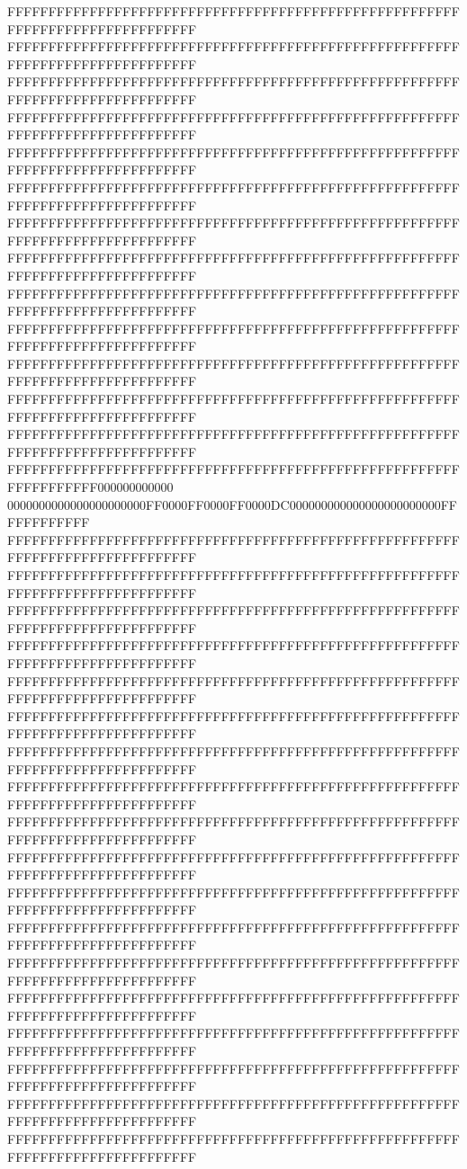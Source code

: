 FFFFFFFFFFFFFFFFFFFFFFFFFFFFFFFFFFFFFFFFFFFFFFFFFFFFFFFFFFFFFFFFFFFFFFFFFFFFFF
FFFFFFFFFFFFFFFFFFFFFFFFFFFFFFFFFFFFFFFFFFFFFFFFFFFFFFFFFFFFFFFFFFFFFFFFFFFFFF
FFFFFFFFFFFFFFFFFFFFFFFFFFFFFFFFFFFFFFFFFFFFFFFFFFFFFFFFFFFFFFFFFFFFFFFFFFFFFF
FFFFFFFFFFFFFFFFFFFFFFFFFFFFFFFFFFFFFFFFFFFFFFFFFFFFFFFFFFFFFFFFFFFFFFFFFFFFFF
FFFFFFFFFFFFFFFFFFFFFFFFFFFFFFFFFFFFFFFFFFFFFFFFFFFFFFFFFFFFFFFFFFFFFFFFFFFFFF
FFFFFFFFFFFFFFFFFFFFFFFFFFFFFFFFFFFFFFFFFFFFFFFFFFFFFFFFFFFFFFFFFFFFFFFFFFFFFF
FFFFFFFFFFFFFFFFFFFFFFFFFFFFFFFFFFFFFFFFFFFFFFFFFFFFFFFFFFFFFFFFFFFFFFFFFFFFFF
FFFFFFFFFFFFFFFFFFFFFFFFFFFFFFFFFFFFFFFFFFFFFFFFFFFFFFFFFFFFFFFFFFFFFFFFFFFFFF
FFFFFFFFFFFFFFFFFFFFFFFFFFFFFFFFFFFFFFFFFFFFFFFFFFFFFFFFFFFFFFFFFFFFFFFFFFFFFF
FFFFFFFFFFFFFFFFFFFFFFFFFFFFFFFFFFFFFFFFFFFFFFFFFFFFFFFFFFFFFFFFFFFFFFFFFFFFFF
FFFFFFFFFFFFFFFFFFFFFFFFFFFFFFFFFFFFFFFFFFFFFFFFFFFFFFFFFFFFFFFFFFFFFFFFFFFFFF
FFFFFFFFFFFFFFFFFFFFFFFFFFFFFFFFFFFFFFFFFFFFFFFFFFFFFFFFFFFFFFFFFFFFFFFFFFFFFF
FFFFFFFFFFFFFFFFFFFFFFFFFFFFFFFFFFFFFFFFFFFFFFFFFFFFFFFFFFFFFFFFFFFFFFFFFFFFFF
FFFFFFFFFFFFFFFFFFFFFFFFFFFFFFFFFFFFFFFFFFFFFFFFFFFFFFFFFFFFFFFFFF000000000000
0000000000000000000000FF0000FF0000FF0000DC000000000000000000000000FFFFFFFFFFFF
FFFFFFFFFFFFFFFFFFFFFFFFFFFFFFFFFFFFFFFFFFFFFFFFFFFFFFFFFFFFFFFFFFFFFFFFFFFFFF
FFFFFFFFFFFFFFFFFFFFFFFFFFFFFFFFFFFFFFFFFFFFFFFFFFFFFFFFFFFFFFFFFFFFFFFFFFFFFF
FFFFFFFFFFFFFFFFFFFFFFFFFFFFFFFFFFFFFFFFFFFFFFFFFFFFFFFFFFFFFFFFFFFFFFFFFFFFFF
FFFFFFFFFFFFFFFFFFFFFFFFFFFFFFFFFFFFFFFFFFFFFFFFFFFFFFFFFFFFFFFFFFFFFFFFFFFFFF
FFFFFFFFFFFFFFFFFFFFFFFFFFFFFFFFFFFFFFFFFFFFFFFFFFFFFFFFFFFFFFFFFFFFFFFFFFFFFF
FFFFFFFFFFFFFFFFFFFFFFFFFFFFFFFFFFFFFFFFFFFFFFFFFFFFFFFFFFFFFFFFFFFFFFFFFFFFFF
FFFFFFFFFFFFFFFFFFFFFFFFFFFFFFFFFFFFFFFFFFFFFFFFFFFFFFFFFFFFFFFFFFFFFFFFFFFFFF
FFFFFFFFFFFFFFFFFFFFFFFFFFFFFFFFFFFFFFFFFFFFFFFFFFFFFFFFFFFFFFFFFFFFFFFFFFFFFF
FFFFFFFFFFFFFFFFFFFFFFFFFFFFFFFFFFFFFFFFFFFFFFFFFFFFFFFFFFFFFFFFFFFFFFFFFFFFFF
FFFFFFFFFFFFFFFFFFFFFFFFFFFFFFFFFFFFFFFFFFFFFFFFFFFFFFFFFFFFFFFFFFFFFFFFFFFFFF
FFFFFFFFFFFFFFFFFFFFFFFFFFFFFFFFFFFFFFFFFFFFFFFFFFFFFFFFFFFFFFFFFFFFFFFFFFFFFF
FFFFFFFFFFFFFFFFFFFFFFFFFFFFFFFFFFFFFFFFFFFFFFFFFFFFFFFFFFFFFFFFFFFFFFFFFFFFFF
FFFFFFFFFFFFFFFFFFFFFFFFFFFFFFFFFFFFFFFFFFFFFFFFFFFFFFFFFFFFFFFFFFFFFFFFFFFFFF
FFFFFFFFFFFFFFFFFFFFFFFFFFFFFFFFFFFFFFFFFFFFFFFFFFFFFFFFFFFFFFFFFFFFFFFFFFFFFF
FFFFFFFFFFFFFFFFFFFFFFFFFFFFFFFFFFFFFFFFFFFFFFFFFFFFFFFFFFFFFFFFFFFFFFFFFFFFFF
FFFFFFFFFFFFFFFFFFFFFFFFFFFFFFFFFFFFFFFFFFFFFFFFFFFFFFFFFFFFFFFFFFFFFFFFFFFFFF
FFFFFFFFFFFFFFFFFFFFFFFFFFFFFFFFFFFFFFFFFFFFFFFFFFFFFFFFFFFFFFFFFFFFFFFFFFFFFF
FFFFFFFFFFFFFFFFFFFFFFFFFFFFFFFFFFFFFFFFFFFFFFFFFFFFFFFFFFFFFFFFFFFFFFFFFFFFFF

